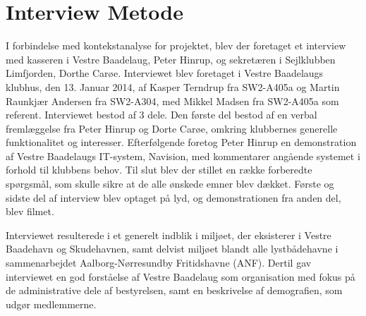 \chapter{Interview Metode}

I forbindelse med kontekstanalyse for projektet, blev der foretaget et interview med kasseren i Vestre Baadelaug, Peter Hinrup, og sekretæren i Sejlklubben Limfjorden, Dorthe Carøe. Interviewet blev foretaget i Vestre Baadelaugs klubhus, den 13. Januar 2014, af Kasper Terndrup fra SW2-A405a og Martin Raunkjær Andersen fra SW2-A304, med Mikkel Madsen fra SW2-A405a som referent. Interviewet bestod af 3 dele. Den første del bestod af en verbal fremlæggelse fra Peter Hinrup og Dorte Carøe, omkring klubbernes generelle funktionalitet og interesser. Efterfølgende foretog Peter Hinrup en demonstration af Vestre Baadelaugs IT-system, Navision, med kommentarer angående systemet i forhold til klubbens behov. Til slut blev der stillet en række forberedte spørgsmål, som skulle sikre at de alle ønskede emner blev dækket. Første og sidste del af interview blev optaget på lyd, og demonstrationen fra anden del, blev filmet.

Interviewet resulterede i et generelt indblik i miljøet, der eksisterer i Vestre Baadehavn og Skudehavnen, samt delvist miljøet blandt alle lystbådehavne i sammenarbejdet Aalborg-Nørresundby Fritidshavne (ANF). Dertil gav interviewet en god forståelse af Vestre Baadelaug som organisation med fokus på de administrative dele af bestyrelsen, samt en beskrivelse af demografien, som udgør medlemmerne.

